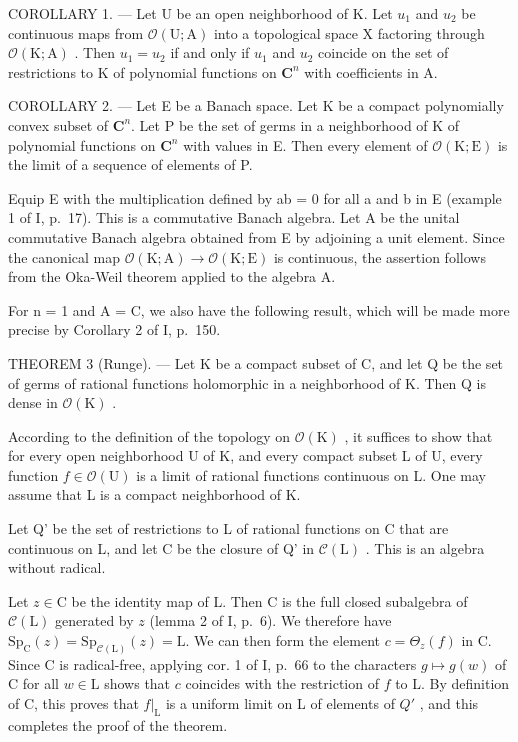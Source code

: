 COROLLARY 1. --- Let U be an open neighborhood of K. Let \(u_{1}\) and \(u_{2}\) be continuous maps from \(\mathcal{O}(\mathrm{U};\mathrm{A})\) into a topological space X factoring through \(\mathcal{O}(\mathrm{K};\mathrm{A})\) . Then \(u_{1}=u_{2}\) if and only if \(u_{1}\) and \(u_{2}\) coincide on the set of restrictions to K of polynomial functions on \(\mathbf{C}^{n}\) with coefficients in A.

COROLLARY 2. --- Let E be a Banach space. Let K be a compact polynomially convex subset of \(\mathbf{C}^{n}\). Let P be the set of germs in a neighborhood of K of polynomial functions on \(\mathbf{C}^{n}\) with values in E. Then every element of \(\mathcal{O}(\mathrm{K};\mathrm{E})\) is the limit of a sequence of elements of P.

Equip E with the multiplication defined by ab = 0 for all a and b in E (example 1 of I, p.~17). This is a commutative Banach algebra. Let A be the unital commutative Banach algebra obtained from E by adjoining a unit element. Since the canonical map \(\mathcal{O}(\mathrm{K};\mathrm{A}) \to \mathcal{O}(\mathrm{K};\mathrm{E})\) is continuous, the assertion follows from the Oka-Weil theorem applied to the algebra A.

For n = 1 and A = C, we also have the following result, which will be made more precise by Corollary 2 of I, p.~150.

THEOREM 3 (Runge). --- Let K be a compact subset of C, and let Q be the set of germs of rational functions holomorphic in a neighborhood of K. Then Q is dense in \(\mathcal{O}(\mathrm{K})\) .

According to the definition of the topology on \(\mathcal{O}(\mathrm{K})\) , it suffices to show that for every open neighborhood U of K, and every compact subset L of U, every function \(f \in \mathcal{O}(\mathrm{U})\) is a limit of rational functions continuous on L. One may assume that L is a compact neighborhood of K.

Let Q' be the set of restrictions to L of rational functions on C that are continuous on L, and let C be the closure of Q' in \(\mathcal{C}(\mathrm{L})\) . This is an algebra without radical.

Let \(z \in \mathrm{C}\) be the identity map of L. Then C is the full closed subalgebra of \(\mathcal{C}(\mathrm{L})\) generated by \(z\) (lemma 2 of I, p.~6). We therefore have \(\mathrm{Sp}_{\mathrm{C}}(z) = \mathrm{Sp}_{\mathcal{C}(\mathrm{L})}(z) = \mathrm{L}\). We can then form the element \(c = \Theta_z(f)\) in C. Since C is radical-free, applying cor. 1 of I, p.~66 to the characters \(g \mapsto g(w)\) of C for all \(w \in \mathrm{L}\) shows that \(c\) coincides with the restriction of \(f\) to L. By definition of C, this proves that \(f|_{\mathrm{L}}\) is a uniform limit on L of elements of \(Q'\) , and this completes the proof of the theorem.

